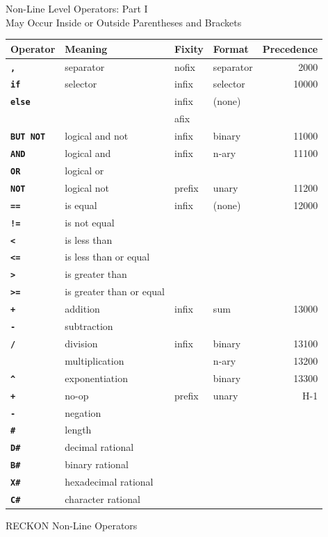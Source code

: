 \documentclass[12pt]{article}
\newcommand{\ttkey}[1]{{\tt \bfseries #1}}
\newlength{\figurewidth}
\newenvironment{boxedfigure}[1][!btp]%
	{\begin{figure*}[#1]
	 \begin{lrbox}{\figurebox}
	 \begin{minipage}{\figurewidth}

	 \vspace*{1ex}}%
	{
	 \vspace*{1ex}

	 \end{minipage}
	 \end{lrbox}
	 \begin{center}
	 \fbox{\hspace*{0.1in}\usebox{\figurebox}\hspace*{0.1in}}
	 \end{center}
	 \end{figure*}}
\begin{document}
\begin{boxedfigure}[!p]
\begin{center}
Non-Line Level Operators: Part I \\
May Occur Inside or Outside Parentheses and Brackets
\\[1ex]
\begin{tabular}{|l|l|l|l|r|}
\hline
Operator & Meaning & Fixity & Format & Precedence \\
\hline
\ttkey{,} & separator & nofix & separator & 2000
\\\hline
\ttkey{if} & selector & infix & selector & 10000
\\\cline{1-1}\cline{3-4}
\ttkey{else} & & infix & (none) & \\
             & & afix & &
\\\hline
\ttkey{BUT NOT} & logical and not & infix & binary & 11000
\\\hline
\ttkey{AND} & logical and & infix & n-ary & 11100
\\\cline{1-2}
\ttkey{OR}  & logical or  & & &
\\\hline
\ttkey{NOT}  & logical not & prefix & unary & 11200
\\\hline
\ttkey{==}  & is equal & infix & (none) & 12000
\\\cline{1-2}
\ttkey{!=}  & is not equal & & &
\\\cline{1-2}
\ttkey{<}  & is less than & & &
\\\cline{1-2}
\ttkey{<=}  & is less than or equal & & &
\\\cline{1-2}
\ttkey{>}  & is greater than & & &
\\\cline{1-2}
\ttkey{>=}  & is greater than or equal & & &
\\\hline
\ttkey{+}  & addition & infix & sum & 13000
\\\cline{1-2}
\ttkey{-}  & subtraction & & &
\\\hline
\ttkey{/}  & division & infix & binary & 13100
\\\cline{1-2}\cline{4-5}
\ttkey{*}  & multiplication & & n-ary & 13200
\\\cline{1-2}\cline{4-5}
\ttkey{\textasciicircum}  & exponentiation & & binary & 13300
\\\hline
\ttkey{+}  & no-op & prefix & unary & H-1
\\\cline{1-2}
\ttkey{-}  & negation & & & 
\\\cline{1-2}
\ttkey{\#}  & length & & & 
\\\cline{1-2}
\ttkey{D\#}  & decimal rational & & & 
\\\cline{1-2}
\ttkey{B\#}  & binary rational & & & 
\\\cline{1-2}
\ttkey{X\#}  & hexadecimal rational & & & 
\\\cline{1-2}
\ttkey{C\#}  & character rational & & & 
\\\hline

\end{tabular}
\end{center}

\caption{RECKON Non-Line Operators}
\label{RECKON-NON-LINE-OPERATORS}
\end{boxedfigure}
\end{document}
